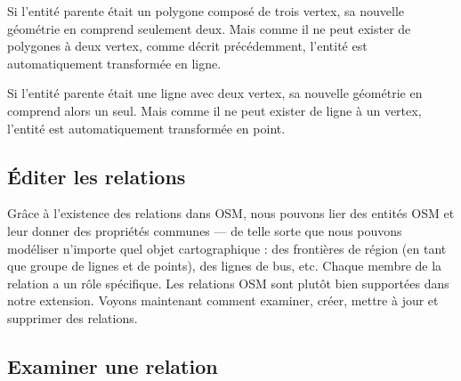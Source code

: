 Si l'entité parente était un polygone composé de trois vertex, sa nouvelle géométrie en comprend seulement deux. Mais comme il ne peut exister de polygones à deux vertex, comme décrit précédemment, l'entité est automatiquement transformée en ligne.

Si l'entité parente était une ligne avec deux vertex, sa nouvelle géométrie en comprend alors un seul. Mais comme il ne peut exister de ligne à un vertex, l'entité est automatiquement transformée en point.

\subsection{Éditer les relations}\label{editing_osm_relation}

Grâce à l'existence des relations dans OSM, nous pouvons lier des entités OSM et leur donner des propriétés communes — de telle sorte que nous pouvons modéliser n'importe quel objet cartographique : des frontières de région (en tant que groupe de lignes et de points), des lignes de bus, etc. Chaque membre de la relation a un rôle spécifique. Les relations OSM sont plutôt bien supportées dans notre extension. Voyons maintenant comment examiner, créer, mettre à jour et supprimer des relations.

\subsection{Examiner une relation}\label{examrelation}

